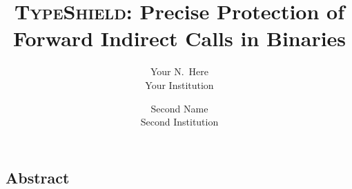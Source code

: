 \documentclass[letterpaper,twocolumn,10pt]{article}
\begin{document}
\date{}

\title{\Large \bf \textsc{TypeShield}: Precise Protection of Forward Indirect Calls in Binaries}

\author{
{\rm Your N.\ Here}\\
Your Institution
\and
{\rm Second Name}\\
Second Institution
} %

\maketitle

\thispagestyle{empty}


\subsection*{Abstract}

	











\listoftodos

{\footnotesize 
}

\end{document}

